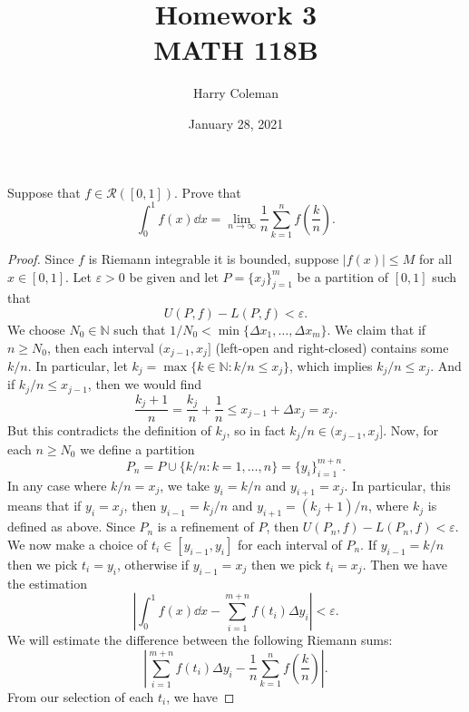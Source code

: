 \documentclass[12pt]{article}
\title{Homework 3\\
    \large MATH 118B
}
\author{Harry Coleman}
\date{January 28, 2021}
\newenvironment{problem}
    {\begin{lrbox}{\mybox}\begin{minipage}{0.98\textwidth}}
    {\end{minipage}\end{lrbox}\begin{center}\framebox[\textwidth]{\usebox{\mybox}}\end{center}}
\theoremstyle{definition}
\newcommand{\N}{\mathbb{N}}
\newcommand{\eps}{\varepsilon}
\begin{document}
\maketitle

\section{}
\begin{problem}
    Suppose that $f \in \mathcal{R}([0,1])$. Prove that 
    \begin{equation}
        \int_0^1 f(x)  \dd{x} = \lim_{n\to \infty} \frac{1}{n}\sum_{k=1}^n f\left (\frac{k}{n}\right).
    \end{equation}
\end{problem}

\begin{proof}
    Since $f$ is Riemann integrable it is bounded, suppose $|f(x)| \leq M$ for all $x \in [0,1]$. Let $\eps > 0$ be given and let $P = \{x_j\}_{j=1}^m$ be a partition of $[0, 1]$ such that
    \[
        U(P, f) - L(P, f) < \eps.
    \]
    We choose $N_0 \in \N$ such that $1/N_0 < \min\{\Delta x_1, \dots, \Delta x_m\}$. We claim that if $n \geq N_0$, then each interval $(x_{j-1}, x_j]$ (left-open and right-closed) contains some $k/n$. In particular, let $k_j = \max\{k \in \N : k/n \leq x_j\}$, which implies $k_j/n \leq x_j$. And if $k_j/n \leq x_{j-1}$, then we would find
    \[
        \frac{k_j + 1}{n} = \frac{k_j}{n} + \frac1n \leq x_{j-1} + \Delta x_j = x_j.
    \]
    But this contradicts the definition of $k_j$, so in fact $k_j/n \in (x_{j-1}, x_j]$. Now, for each $n \geq N_0$ we define a partition
    \[
        P_n = P \cup \{k/n : k = 1, \dots, n\} = \{y_i\}_{i=1}^{m+n}.
    \]
    In any case where $k/n = x_j$, we take $y_i = k/n$ and $y_{i+1} = x_j$. In particular, this means that if $y_i = x_j$, then $y_{i-1} = k_j/n$ and $y_{i+1} = (k_j+1)/n$, where $k_j$ is defined as above. Since $P_n$ is a refinement of $P$, then $U(P_n, f) - L(P_n, f) < \eps$. We now make a choice of $t_i \in [y_{i-1}, y_i]$ for each interval of $P_n$. If $y_{i-1} = k/n$ then we pick $t_i = y_i$, otherwise if $y_{i-1} = x_j$ then we pick $t_i = x_j$. Then we have the estimation
    \[
        \left| \int_0^1 f(x)  \dd{x} - \sum_{i=1}^{m+n} f(t_i) \Delta y_i \right| < \eps.
    \]
    We will estimate the difference between the following Riemann sums:
    \[
        \left| \sum_{i=1}^{m+n} f(t_i) \Delta y_i - \frac{1}{n}\sum_{k=1}^n f\left (\frac{k}{n}\right)\right|.
    \]
    From our selection of each $t_i$, we have

\end{proof}
\end{document}

